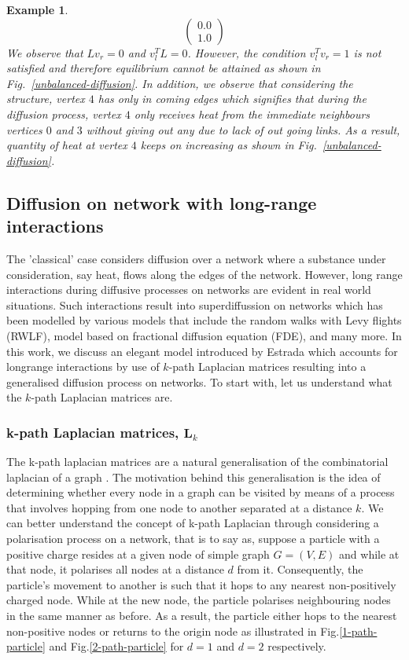 \documentclass[10pt,a4paper]{article}
\newtheorem{exa}{Example}
\begin{document}
\begin{exa}
\begin{equation*}
\begin{pmatrix}
   0.0 \\
   1.0
   \end{pmatrix}
   \end{equation*}
   We observe that $Lv_r = 0$ and $v_l^TL = 0$. However, the condition $v_l^T v_r = 1$  is not satisfied and therefore equilibrium cannot be attained as shown in Fig.~\ref{unbalanced-diffusion}. In addition, we observe that considering the structure, vertex $4$ has only in coming edges which signifies that during the diffusion process, vertex $4$ only receives heat from the immediate neighbours vertices $0$ and $3$ without giving out any due to lack of out going links. As a result, quantity of heat at vertex $4$ keeps on increasing as shown in Fig.~\ref{unbalanced-diffusion}.
   \end{exa}
	
    \subsection{Diffusion on network with long-range interactions}
    The 'classical' case considers diffusion over a network where a substance under consideration, say heat, flows along the edges of the network. However, long range interactions during diffusive processes on networks are evident in real world situations. Such interactions result into superdiffussion on networks which has been modelled by various models that include the random walks with Levy flights (RWLF), model based on fractional diffusion equation (FDE), and many more. In this work, we discuss an elegant model introduced by Estrada \citep{estrada2017path} which accounts for longrange interactions by use of $k$-path Laplacian matrices resulting into a generalised diffusion process on networks. To start with, let us understand what the $k$-path Laplacian matrices are.
    	    \subsubsection{ k-path Laplacian matrices, $\mathbf{L}_k$}
    	    The k-path laplacian matrices are a natural generalisation of the combinatorial laplacian of a graph \citep{estrada2012path}. The motivation behind this generalisation is the idea of determining whether every node in a graph can be visited by means of a process that involves hopping from one node to another separated at a distance $k$. We can better understand the concept of k-path Laplacian through considering a polarisation process on a network, that is to say as, suppose a particle with a positive charge resides at a given node of simple graph $G= (V,E)$ and while at that node, it polarises all nodes at a distance $d$ from it. Consequently, the particle's movement to another is such that it hops to any nearest non-positively charged node. While at the new node, the particle polarises neighbouring nodes in the same manner as before. As a result, the particle either hops to the nearest non-positive nodes or returns to the origin node as illustrated in Fig.\ref{1-path-particle} and Fig.\ref{2-path-particle} for $d=1$ and $d=2$ respectively.
    	    
\end{document}
